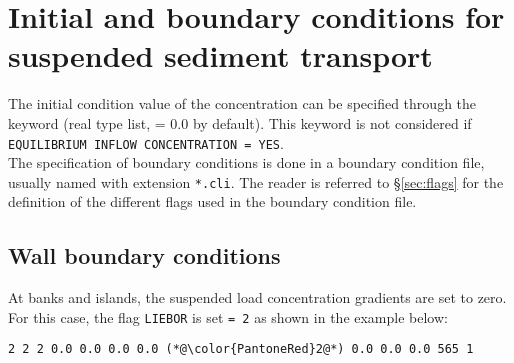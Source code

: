 \section{Initial and boundary conditions for suspended sediment transport}
The initial condition value of the concentration can be specified through the keyword  (real type list, {\ttfamily = 0.0} by default). This keyword is not considered if \texttt{EQUILIBRIUM INFLOW CONCENTRATION = YES}.\\

The specification of boundary conditions is done in a boundary condition file, usually named with extension \texttt{*.cli}. The reader is referred to \S\ref{sec:flags} for the definition of the different flags used in the boundary condition file.

\subsection{Wall boundary conditions}
At banks and islands, the suspended load concentration gradients are set to zero. For this case, the flag \texttt{LIEBOR} is set \texttt{= 2} as shown in the example below:

\begin{lstlisting}[frame=trBL]
2 2 2 0.0 0.0 0.0 0.0 (*@\color{PantoneRed}2@*) 0.0 0.0 0.0 565 1
\end{lstlisting}

